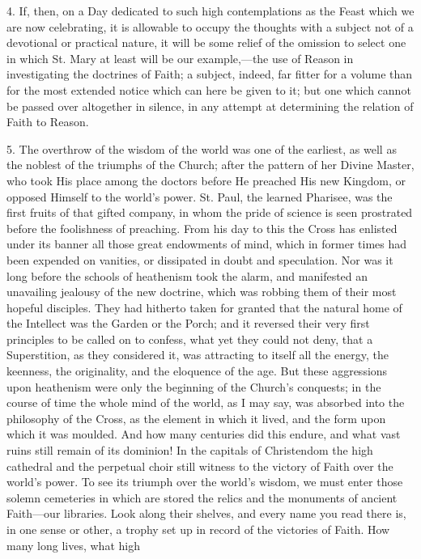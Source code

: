 4. If, then, on a Day dedicated to such high contemplations as the
Feast which we are now celebrating, it is allowable to occupy the
thoughts with a subject not of a devotional or practical nature, it
will be some relief of the omission to select one in which St. Mary at
least will be our example,—the use of Reason in investigating the
doctrines of Faith; a subject, indeed, far fitter for a volume than
for the most extended notice which can here be given to it; but one
which cannot be passed over altogether in silence, in any attempt at
determining the relation of Faith to Reason.

5. The overthrow of the wisdom of the world was one of the
earliest, as well as the noblest of the triumphs of the Church; after
the pattern of her Divine Master, who took His place among the doctors
before He preached His new Kingdom, or opposed Himself to the world's
power. St. Paul, the learned Pharisee, was the first fruits of that
gifted company, in whom the pride of science is seen prostrated before
the foolishness of preaching. From his day to this the Cross has
enlisted under its banner all those great endowments of mind, which in
former times had been expended on vanities, or dissipated in doubt and
speculation. Nor was it long before the schools of heathenism took the
alarm, and manifested an unavailing jealousy of the new doctrine,
which was robbing them of their most hopeful disciples. They had
hitherto taken for granted that the natural home of the Intellect was
the Garden or the Porch; and it reversed their very first principles
to be called on to confess, what yet they could not deny, that a
Superstition, as they considered it, was attracting to itself all the
energy, the keenness, the originality, and the eloquence of the age.
But these aggressions upon heathenism were only the beginning of the
Church's conquests; in the course of time the whole mind of the world,
as I may say, was absorbed into the philosophy of the Cross, as the
element in which it lived, and the form upon which it was moulded. And
how many centuries did this endure, and what vast ruins still remain
of its dominion! In the capitals of Christendom the high cathedral and
the perpetual choir still witness to the victory of Faith over the
world's power. To see its triumph over the world's wisdom, we must
enter those solemn cemeteries in which are stored the relics and the
monuments of ancient Faith—our libraries. Look along their shelves,
and every name you read there is, in one sense or other, a trophy set
up in record of the victories of Faith. How many long lives, what high
